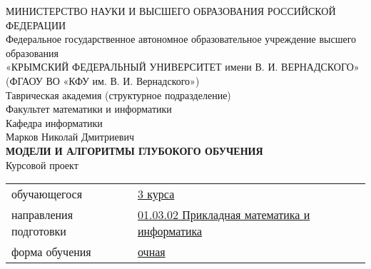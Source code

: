 \begin{center}
\small
МИНИСТЕРСТВО НАУКИ И ВЫСШЕГО ОБРАЗОВАНИЯ РОССИЙСКОЙ ФЕДЕРАЦИИ\\
{\normalsize Федеральное государственное автономное образовательное учреждение высшего образования}\\
«КРЫМСКИЙ ФЕДЕРАЛЬНЫЙ УНИВЕРСИТЕТ имени В. И. ВЕРНАДСКОГО»\\
(ФГАОУ ВО «КФУ им. В. И. Вернадского»)\\
\normalsize
Таврическая академия (структурное подразделение)\\
Факультет математики и информатики\\
Кафедра информатики\\
\vspace*{2\baselineskip}
Марков Николай Дмитриевич\\
\vspace*{1\baselineskip}
\textbf{МОДЕЛИ И АЛГОРИТМЫ ГЛУБОКОГО ОБУЧЕНИЯ}\\
\vspace*{2\baselineskip}
Курсовой проект\\
\vspace*{1\baselineskip}
\end{center}

 
\begin{tabular}{m{12em} m{10em}}
	обучающегося & \underline{3 курса}\\
	направления подготовки &\underline{01.03.02 Прикладная математика и информатика}\\
	форма обучения &\underline{очная}\\
\end{tabular}\\

\vspace*{4\baselineskip}

